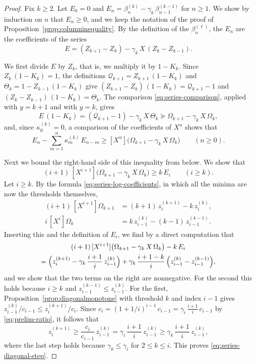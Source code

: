 \documentclass{amsart}
\theoremstyle{definition}
\theoremstyle{remark}
\numberwithin{equation}{section}
\begin{document}
\begin{proof}
Fix $k\ge 2$. Let $E_0=0$ and $E_n=\beta^{(k)}_n-\gamma_k\,\beta^{(k-1)}_{n-1}$ for $n\ge 1$. We show by induction on $n$ that $E_n\ge 0$, and we keep the notation of the proof of Proposition~\ref{prop:columninequality}. By the definition of the $\beta^{(\ell)}_n$, the $E_n$ are the coefficients of the series
\[
E=(Z_{k+1}-Z_k)-\gamma_k\,X\,(Z_k-Z_{k-1}) .
\]

We first divide $E$ by $Z_k$, that is, we multiply it by $1-K_k$. Since $Z_k\,(1-K_k)=1$, the definitions $\mathcal{Q}_{k+1}=Z_{k+1}\,(1-K_k)$ and $\Theta_k=1-Z_{k-1}\,(1-K_k)$ give $(Z_{k+1}-Z_k)\,(1-K_k)=\mathcal{Q}_{k+1}-1$ and $(Z_k-Z_{k-1})\,(1-K_k)=\Theta_k$. The comparison \eqref{eq:series-comparison}, applied with $y=k+1$ and with $y=k$, gives
\[
E\,(1-K_k)=(\mathcal{Q}_{k+1}-1)-\gamma_k\,X\,\Theta_k\succeq \Omega_{k+1}-\gamma_k\,X\,\Omega_k ,
\]
and, since $\kappa^{(k)}_0=0$, a comparison of the coefficients of $X^n$ shows that
\begin{equation}\label{eq:series-diagonal-division}
E_n-\sum_{m=1}^{n}\kappa^{(k)}_m\,E_{n-m}\ge[X^n]\bigl(\Omega_{k+1}-\gamma_k\,X\,\Omega_k\bigr)\qquad(n\ge 0).
\end{equation}

Next we bound the right-hand side of this inequality from below. We show that
\begin{equation}\label{eq:series-diagonal-step}
(i+1)\,[X^{i+1}]\bigl(\Omega_{k+1}-\gamma_k\,X\,\Omega_k\bigr)\ge k\,E_i\qquad(i\ge k).
\end{equation}
Let $i\ge k$. By the formula \eqref{eq:series-log-coefficients}, in which all the minima are now the thresholds themselves,
\begin{align*}
(i+1)\,[X^{i+1}]\Omega_{k+1}&=(k+1)\,z^{(k+1)}_i-k\,z^{(k)}_i ,\\
i\,[X^{i}]\Omega_k&=k\,z^{(k)}_{i-1}-(k-1)\,z^{(k-1)}_{i-1} .
\end{align*}
Inserting this and the definition of $E_i$, we find by a direct computation that
\begin{multline*}
(i+1)\,[X^{i+1}]\bigl(\Omega_{k+1}-\gamma_k\,X\,\Omega_k\bigr)-k\,E_i\\
=\Bigl(z^{(k+1)}_i-\gamma_k\,\frac{i+1}{i}\,z^{(k)}_{i-1}\Bigr)+\gamma_k\,\frac{i+1-k}{i}\,\Bigl(z^{(k)}_{i-1}-z^{(k-1)}_{i-1}\Bigr),
\end{multline*}
and we show that the two terms on the right are nonnegative. For the second this holds because $i\ge k$ and $z^{(k-1)}_{i-1}\le z^{(k)}_{i-1}$. For the first, Proposition~\ref{prop:diagonalmonotone} with threshold $k$ and index $i-1$ gives $z^{(k)}_{i-1}/c_{i-1}\le z^{(k+1)}_i/c_i$. Since $c_i=(1+1/i)^{i-1}\,c_{i-1}=\gamma_i\,\frac{i+1}{i}\,c_{i-1}$ by \eqref{eq:prelim-ratio}, it follows that
\[
z^{(k+1)}_i\ge\frac{c_i}{c_{i-1}}\,z^{(k)}_{i-1}=\gamma_i\,\frac{i+1}{i}\,z^{(k)}_{i-1}\ge\gamma_k\,\frac{i+1}{i}\,z^{(k)}_{i-1} ,
\]
where the last step holds because $\gamma_k\le\gamma_i$ for $2\le k\le i$. This proves \eqref{eq:series-diagonal-step}.


\end{proof}
\end{document}
